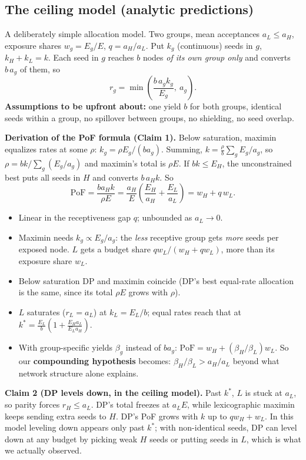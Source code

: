 \documentclass[11pt]{article}
\newcommand{\PoF}{\mathrm{PoF}}
\begin{document}
\subsection{The ceiling model (analytic predictions)}\label{sec:q2-ceiling}
A deliberately simple allocation model. Two groups, mean acceptances $a_L\le a_H$, exposure shares $w_g=E_g/E$, $q=a_H/a_L$. Put $k_g$ (continuous) seeds in $g$, $k_H+k_L=k$. Each seed in $g$ reaches $b$ nodes \emph{of its own group only} and converts $b\,a_g$ of them, so
\[
r_g=\min\!\left(\frac{b\,a_g k_g}{E_g},\ a_g\right).
\]
\textbf{Assumptions to be upfront about:} one yield $b$ for both groups, identical seeds within a group, no spillover between groups, no shielding, no seed overlap.

\textbf{Derivation of the PoF formula (Claim 1).} Below saturation, maximin equalizes rates at some $\rho$: $k_g=\rho E_g/(b a_g)$. Summing, $k=\frac{\rho}{b}\sum_g E_g/a_g$, so $\rho=bk/\sum_g(E_g/a_g)$ and maximin's total is $\rho E$. If $bk\le E_H$, the unconstrained best puts all seeds in $H$ and converts $b\,a_H k$. So
\[
\PoF=\frac{b a_H k}{\rho E}=\frac{a_H}{E}\left(\frac{E_H}{a_H}+\frac{E_L}{a_L}\right)=w_H+q\,w_L .
\]
\begin{itemize}
\item Linear in the receptiveness gap $q$; unbounded as $a_L\to0$.
\item Maximin needs $k_g\propto E_g/a_g$: the \emph{less} receptive group gets \emph{more} seeds per exposed node. $L$ gets a budget share $q w_L/(w_H+qw_L)$, more than its exposure share $w_L$.
\item Below saturation DP and maximin coincide (DP's best equal-rate allocation is the same, since its total $\rho E$ grows with $\rho$).
\item $L$ saturates ($r_L=a_L$) at $k_L=E_L/b$; equal rates reach that at $k^*=\frac{E_L}{b}\left(1+\frac{E_H a_L}{E_L a_H}\right)$.
\item With group-specific yields $\beta_g$ instead of $b a_g$: $\PoF=w_H+(\beta_H/\beta_L)w_L$. So our \textbf{compounding hypothesis} becomes: $\beta_H/\beta_L>a_H/a_L$ beyond what network structure alone explains.
\end{itemize}

\textbf{Claim 2 (DP levels down, in the ceiling model).} Past $k^*$, $L$ is stuck at $a_L$, so parity forces $r_H\le a_L$. DP's total freezes at $a_L E$, while lexicographic maximin keeps sending extra seeds to $H$. DP's PoF grows with $k$ up to $q w_H+w_L$. In this model leveling down appears only past $k^*$; with non-identical seeds, DP can level down at any budget by picking weak $H$ seeds or putting seeds in $L$, which is what we actually observed.
\end{document}
